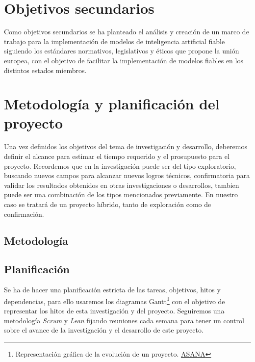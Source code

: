 
\section{Objetivos secundarios}
Como objetivos secundarios se ha planteado el análisis y creación de un marco de trabajo para la implementación de modelos de inteligencia artificial fiable siguiendo los estándares normativos, legislativos y éticos que propone la unión europea, con el objetivo de facilitar la implementación de modelos fiables en los distintos estados miembros.

\section{Metodología y planificación del proyecto}

Una vez definidos los objetivos del tema de investigación y desarrollo, deberemos definir el alcance para estimar el tiempo requerido y el prosupuesto para el proyecto.
Recordemos que en la investigación puede ser del tipo exploratorio, buscando nuevos campos para alcanzar nuevos logros técnicos, confirmatoria para validar los resultados obtenidos en otras investigaciones o desarrollos, tambien puede ser una combinación de los tipos mencionados previamente.
En nuestro caso se tratará de un proyecto híbrido, tanto de exploración como de confirmación.


\subsection{Metodología}


\subsection{Planificación}

Se ha de hacer una planificación estricta de las tareas, objetivos, hitos y dependencias, para ello usaremos los diagramas Gantt\footnote{Representación gráfica de la evolución de un proyecto. \href{https://asana.com/es/resources/gantt-chart-basics}{ASANA}} con el objetivo de representar los hitos de esta investigación y del proyecto.
Seguiremos una metodología \textit{Scrum} y \textit{Lean} fijando reuniones cada semana para tener un control sobre el avance de la investigación y el desarrollo de este proyecto.

